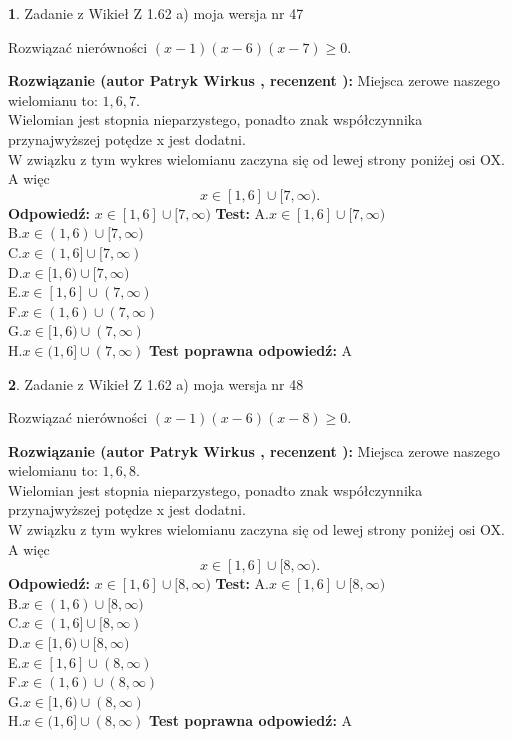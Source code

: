 \documentclass[12pt, a4paper]{article}
\theoremstyle{definition} %
\newtheorem{zad}{}
\newcommand{\zadStart}[1]{\begin{zad}#1\newline}
\newcommand{\zadStop}{\end{zad}}
\newcommand{\rozwStart}[2]{\noindent \textbf{Rozwiązanie (autor #1 , recenzent #2): }\newline}
\newcommand{\rozwStop}{\newline}
\newcommand{\odpStart}{\noindent \textbf{Odpowiedź:}\newline}
\newcommand{\odpStop}{\newline}
\newcommand{\testStart}{\noindent \textbf{Test:}\newline}
\newcommand{\testStop}{\newline}
\newcommand{\kluczStart}{\noindent \textbf{Test poprawna odpowiedź:}\newline}
\newcommand{\kluczStop}{\newline}
\begin{document}
\zadStart{Zadanie z Wikieł Z 1.62 a) moja wersja nr 47}

Rozwiązać nierówności $(x-1)(x-6)(x-7)\ge0$.
\zadStop
\rozwStart{Patryk Wirkus}{}
Miejsca zerowe naszego wielomianu to: $1, 6, 7$.\\
Wielomian jest stopnia nieparzystego, ponadto znak współczynnika przy\linebreak najwyższej potędze x jest dodatni.\\ W związku z tym wykres wielomianu zaczyna się od lewej strony poniżej osi OX. A więc $$x \in [1,6] \cup [7,\infty).$$
\rozwStop
\odpStart
$x \in [1,6] \cup [7,\infty)$
\odpStop
\testStart
A.$x \in [1,6] \cup [7,\infty)$\\
B.$x \in (1,6) \cup [7,\infty)$\\
C.$x \in (1,6] \cup [7,\infty)$\\
D.$x \in [1,6) \cup [7,\infty)$\\
E.$x \in [1,6] \cup (7,\infty)$\\
F.$x \in (1,6) \cup (7,\infty)$\\
G.$x \in [1,6) \cup (7,\infty)$\\
H.$x \in (1,6] \cup (7,\infty)$
\testStop
\kluczStart
A
\kluczStop



\zadStart{Zadanie z Wikieł Z 1.62 a) moja wersja nr 48}

Rozwiązać nierówności $(x-1)(x-6)(x-8)\ge0$.
\zadStop
\rozwStart{Patryk Wirkus}{}
Miejsca zerowe naszego wielomianu to: $1, 6, 8$.\\
Wielomian jest stopnia nieparzystego, ponadto znak współczynnika przy\linebreak najwyższej potędze x jest dodatni.\\ W związku z tym wykres wielomianu zaczyna się od lewej strony poniżej osi OX. A więc $$x \in [1,6] \cup [8,\infty).$$
\rozwStop
\odpStart
$x \in [1,6] \cup [8,\infty)$
\odpStop
\testStart
A.$x \in [1,6] \cup [8,\infty)$\\
B.$x \in (1,6) \cup [8,\infty)$\\
C.$x \in (1,6] \cup [8,\infty)$\\
D.$x \in [1,6) \cup [8,\infty)$\\
E.$x \in [1,6] \cup (8,\infty)$\\
F.$x \in (1,6) \cup (8,\infty)$\\
G.$x \in [1,6) \cup (8,\infty)$\\
H.$x \in (1,6] \cup (8,\infty)$
\testStop
\kluczStart
A
\kluczStop
\end{document}
